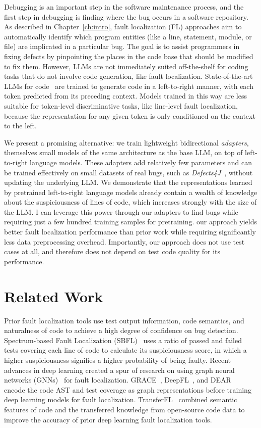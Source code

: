 \documentclass[12pt,openany,oneside,table]{cmuthesis}
\begin{document}
Debugging is an important step in the software maintenance process, and the first step in debugging is finding where the bug occurs in a software repository.
As described in Chapter~\ref{ch:intro}, fault localization (FL) approaches aim to automatically identify which program entities (like a line, statement, module, or file) are implicated in a particular bug. The goal is to assist programmers in fixing defects by pinpointing the places in the code base that should be modified to fix them. 
However, LLMs are not immediately suited off-the-shelf for coding tasks that do not involve code generation, like fault localization. State-of-the-art LLMs for code~\cite{chen2021evaluating, black2021gpt, tunstall2022natural, nijkamp2022codegen} are trained to generate code in a left-to-right manner, with each token predicted from its preceding context. 
Models trained in this way are less suitable for token-level discriminative tasks, like line-level fault localization, because the representation for any given token is only conditioned on the context to the left. 

We present a promising alternative: we train lightweight bidirectional \emph{adapters}, themselves small models of the same architecture as the base LLM, on top of left-to-right language models. These adapters add relatively few parameters and can be trained effectively on small datasets of real bugs, such as \textit{Defects4J}~\cite{just2014defects4j}, without updating the underlying LLM. We demonstrate that the representations learned by pretrained left-to-right language models already contain a wealth of knowledge about the suspiciousness of lines of code, which increases strongly with the size of the LLM.  I can leverage this power through our adapters to find bugs while requiring just a few hundred training samples for pretraining. 
our approach yields better fault localization performance than prior work while requiring significantly less data preprocessing overhead. Importantly, our approach does not use test cases at all, and therefore does not depend on test code quality for its performance. 

\section{Related Work}

Prior fault localization tools use test output information, code semantics, and naturalness of code to achieve a high degree of confidence on bug detection. Spectrum-based Fault Localization (SBFL)~\cite{abreu2006evaluation, abreu2007accuracy} uses a ratio of passed and failed tests covering each line of code to calculate its suspiciousness score, in which a higher suspiciousness signifies a higher probability of being faulty. Recent advances in deep learning created a spur of research on using graph neural networks (GNNs)~\cite{GNN} for fault localization. GRACE~\cite{Grace}, DeepFL~\cite{DeepFL}, and DEAR~\cite{Dear} encode the code AST and test coverage as graph representations before training deep learning models for fault localization. TransferFL~\cite{TransferFL} combined semantic features of code and the transferred knowledge from open-source code data to improve the accuracy of prior deep learning fault localization tools.
\end{document}
